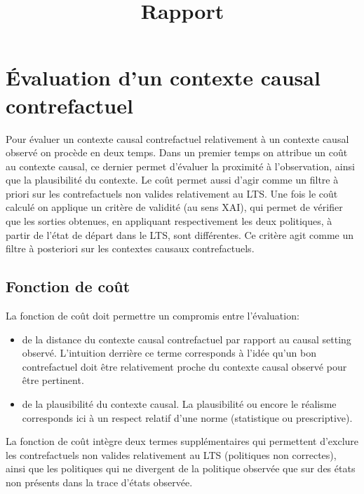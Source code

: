 \documentclass[11pt]{extarticle}
\title{Rapport}
\author{}
\begin{document}
\maketitle
\thispagestyle{empty} 
\newpage
\thispagestyle{empty} 
\tableofcontents
\newpage
\setcounter{page}{1}







\section{Évaluation d'un contexte causal contrefactuel}


Pour évaluer un contexte causal contrefactuel relativement à un contexte causal observé on procède en deux temps. Dans un premier temps on attribue un coût au contexte causal, ce dernier permet d'évaluer la proximité à l'observation, ainsi que la plausibilité du contexte. Le coût permet aussi d'agir comme un filtre à priori sur les contrefactuels non valides relativement au LTS. Une fois le coût calculé on applique un critère de validité (au sens XAI), qui permet de vérifier que les sorties obtenues, en appliquant respectivement les deux politiques, à partir de l'état de départ dans le LTS, sont différentes. Ce critère agit comme un filtre à posteriori sur les contextes causaux contrefactuels.



\subsection{Fonction de coût}

La fonction de coût doit permettre un compromis entre l'évaluation:
\begin{itemize}
    \item  de la distance du contexte causal contrefactuel par rapport au causal setting  observé. L'intuition derrière ce terme corresponds à l'idée qu'un bon contrefactuel doit être relativement proche du contexte causal observé pour être pertinent.
    \item de la plausibilité du contexte causal. La plausibilité ou encore le réalisme corresponds ici à un respect relatif d'une norme (statistique ou prescriptive). 

\end{itemize}

La fonction de coût intègre deux termes supplémentaires qui permettent d'exclure les contrefactuels non valides relativement au LTS (politiques non correctes), ainsi que les politiques qui ne divergent de la politique observée que sur des états non présents dans la trace d'états observée.
\end{document}
